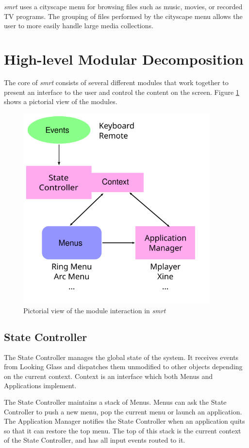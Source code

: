 \documentclass[letterpaper, twoside, titlepage, 11pt]{article}
\begin{document}
\textit{smrt} uses a cityscape menu for browsing files such as music, movies, or
recorded TV programs. The grouping of files performed by the cityscape menu
allows the user to more easily handle large media collections.

\section{High-level Modular Decomposition}
\label{section:modules}
The core of \textit{smrt} consists of several different modules that work together
to present an interface to the user and control the content on the screen.  Figure
\ref{figure:modules} shows a pictorial view of the modules.

\begin{figure}[htb]
\centering
\includegraphics[width=4in]{figures/modules}
\caption{Pictorial view of the module interaction in \textit{smrt}\label{figure:modules}}
\end{figure}

\subsection{State Controller}
The State Controller manages the global state of the system.  It receives events
from Looking Glass and dispatches them unmodified to other objects depending on
the current context.  Context is an interface which both Menus and Applications
implement.

The State Controller maintains a stack of Menus.  Menus can ask the State
Controller to push a new menu, pop the current menu or launch an application.
The Application Manager notifies the State Controller when an application
quits so that it can restore the top menu.  The top of this stack is the
current context of the State Controller, and has all input events routed to
it.
\end{document}
